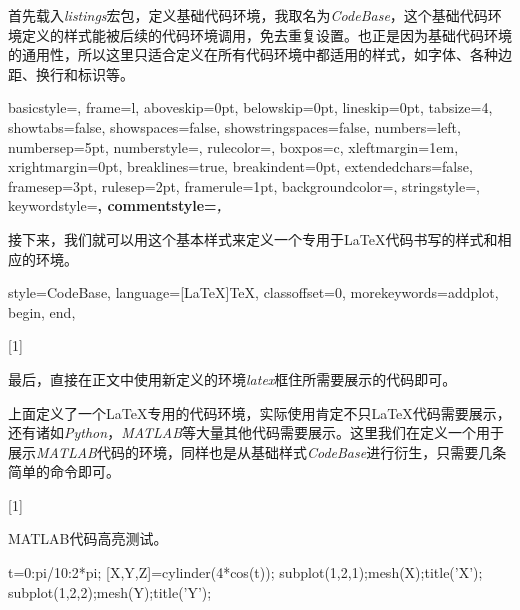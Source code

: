 首先载入\emph{listings}宏包，定义基础代码环境，我取名为\emph{CodeBase}，这个基础代码环境定义的样式能被后续的代码环境调用，免去重复设置。也正是因为基础代码环境的通用性，所以这里只适合定义在所有代码环境中都适用的样式，如字体、各种边距、换行和标识等。

\begin{latex}{}
{
	basicstyle=\small\ttfamily,
	frame=l,
	aboveskip=0pt,%
	belowskip=0pt,%
	lineskip=0pt,
	tabsize=4,%
	showtabs=false,%
	showspaces=false,%
	showstringspaces=false,
	numbers=left,
	numbersep=5pt,%
	numberstyle=\small\ttfamily,
	rulecolor=\color{cyan},
	boxpos=c,
	xleftmargin=1em,%
	xrightmargin=0pt,
	breaklines=true,%
	breakindent=0pt,%
	extendedchars=false,%
	framesep=3pt,
	rulesep=2pt,
	framerule=1pt,
	backgroundcolor=\color{gray!5},
	stringstyle=\color{green!40!black!100},
	keywordstyle=\bfseries\color[RGB]{0,0,255},
	commentstyle=\slshape\color{black!60},
}
\end{latex}

接下来，我们就可以用这个基本样式来定义一个专用于\LaTeX 代码书写的样式和相应的环境。

\begin{latex}{}
{
	style=CodeBase,
	language=[LaTeX]TeX,
	classoffset=0,
	morekeywords={addplot, begin, end},
}

[1]{\lstset{style=LaTeX}}{}
\end{latex}

最后，直接在正文中使用新定义的环境\emph{latex}框住所需要展示的代码即可。

上面定义了一个\LaTeX 专用的代码环境，实际使用肯定不只\LaTeX 代码需要展示，还有诸如\emph{Python}，\emph{MATLAB}等大量其他代码需要展示。这里我们在定义一个用于展示\emph{MATLAB}代码的环境，同样也是从基础样式\emph{CodeBase}进行衍生，只需要几条简单的命令即可。

\begin{latex}{}

[1]{\lstset{style=Matlab}}{}
\end{latex}

MATLAB代码高亮测试。

\begin{Matlab}{}
t=0:pi/10:2*pi;
[X,Y,Z]=cylinder(4*cos(t));
subplot(1,2,1);mesh(X);title('X');
subplot(1,2,2);mesh(Y);title('Y');
\end{Matlab}

